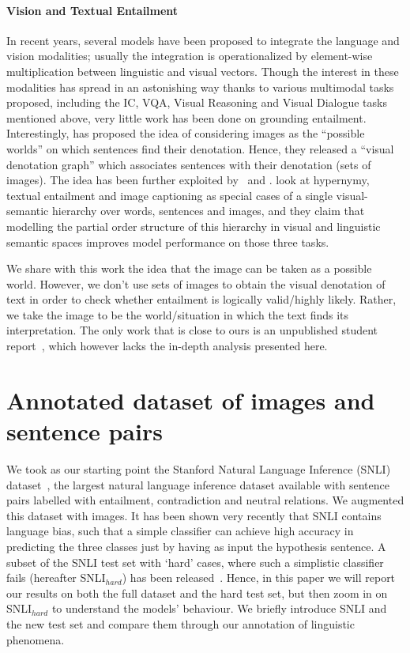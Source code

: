 \documentclass[11pt]{article}
\begin{document}
\paragraph{Vision and Textual Entailment}
In recent years, several models have been proposed to integrate the
language and vision modalities; usually the integration is
operationalized by element-wise
multiplication between linguistic and
visual vectors.
Though the interest in these modalities has spread in
an astonishing way thanks to various multimodal tasks proposed, including
 the IC, VQA, Visual Reasoning and Visual Dialogue tasks mentioned above,
very little work has been done on grounding entailment. Interestingly,
 has proposed the idea of considering images as
the ``possible worlds'' on which sentences find their
denotation. Hence, they released a ``visual denotation graph'' which
associates sentences with their denotation (sets of images). The idea 
has been further exploited by~ and .
 look at hypernymy, textual entailment and image
captioning as special cases of a single visual-semantic hierarchy over
words, sentences and images, and they claim that modelling the partial
order structure of this hierarchy in visual and linguistic semantic
spaces improves model performance on those three tasks.  

We share
with this work the idea that the image can be taken as a possible
world. However, we don't use sets of images to obtain the visual
denotation of text in order to check whether entailment is logically
valid/highly likely. Rather, we take the image to be the
world/situation in which the text finds its interpretation.
The only work that is close to ours is an unpublished student
report~\cite{sitz:mult16}, which however lacks the in-depth analysis presented
here.
 \section{Annotated dataset of images and sentence pairs}
\label{sec:dataset}

We took as our starting point the Stanford Natural Language Inference (SNLI)
dataset~\cite{snli:emnlp2015}, the largest natural language inference
dataset available with sentence pairs labelled with entailment, contradiction and neutral
relations. We augmented this dataset with images. It has
been shown very recently that SNLI contains language bias, such that a
simple classifier can achieve high accuracy in predicting the three
classes just by having as input the hypothesis sentence. A subset of
the SNLI test set with `hard' cases, where such a simplistic classifier fails (hereafter SNLI$_{hard}$)
has
been released~\cite{guru:anno18}. Hence, in this paper we will report
our results on both the full dataset and the hard test set, but then zoom
in on SNLI$_{hard}$
to understand the models' behaviour. We
briefly introduce SNLI and the new test set and compare
them through our annotation of linguistic phenomena.
\end{document}
